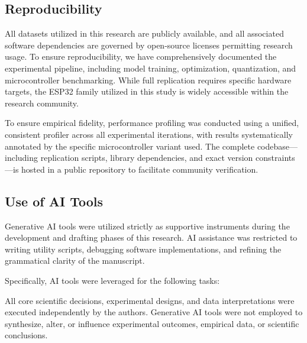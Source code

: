 \subsection{Reproducibility}

All datasets utilized in this research are publicly available, and all associated software dependencies are governed by open-source licenses permitting research usage. To ensure reproducibility, we have comprehensively documented the experimental pipeline, including model training, optimization, quantization, and microcontroller benchmarking. While full replication requires specific hardware targets, the ESP32 family utilized in this study is widely accessible within the research community.

To ensure empirical fidelity, performance profiling was conducted using a unified, consistent profiler across all experimental iterations, with results systematically annotated by the specific microcontroller variant used. The complete codebase—including replication scripts, library dependencies, and exact version constraints—is hosted in a public repository to facilitate community verification.

\subsection{Use of AI Tools}

Generative AI tools were utilized strictly as supportive instruments during the development and drafting phases of this research. AI assistance was restricted to writing utility scripts, debugging software implementations, and refining the grammatical clarity of the manuscript.

Specifically, AI tools were leveraged for the following tasks:

All core scientific decisions, experimental designs, and data interpretations were executed independently by the authors. Generative AI tools were not employed to synthesize, alter, or influence experimental outcomes, empirical data, or scientific conclusions.